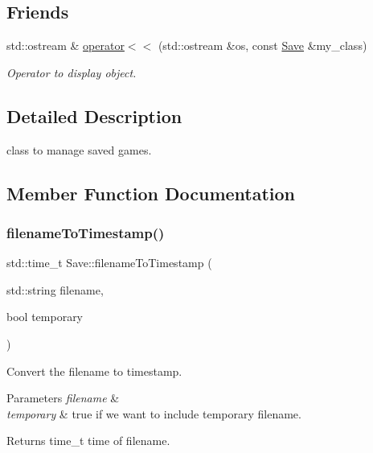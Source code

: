 \subsection*{Friends}
\begin{DoxyCompactItemize}
\item 
std\+::ostream \& \hyperlink{class_save_a3cd403916354948cd0ec21803ec2f78f}{operator$<$$<$} (std\+::ostream \&os, const \hyperlink{class_save}{Save} \&my\+\_\+class)
\begin{DoxyCompactList}\small\item\em Operator to display object. \end{DoxyCompactList}\end{DoxyCompactItemize}


\subsection{Detailed Description}
class to manage saved games. 

\subsection{Member Function Documentation}
\mbox{\label{class_save_af0cd86308d28ff115d3588369baa529a}} 
\subsubsection{\texorpdfstring{filename\+To\+Timestamp()}{filenameToTimestamp()}}
{\footnotesize\ttfamily std\+::time\+\_\+t Save\+::filename\+To\+Timestamp (\begin{DoxyParamCaption}\item[{std\+::string}]{filename,  }\item[{bool}]{temporary }\end{DoxyParamCaption})\hspace{0.3cm}{\ttfamily [static]}}



Convert the filename to timestamp. 


\begin{DoxyParams}{Parameters}
{\em filename} & \\
\hline
{\em temporary} & true if we want to include temporary filename. \\
\hline
\end{DoxyParams}
\begin{DoxyReturn}{Returns}
time\+\_\+t time of filename. 
\end{DoxyReturn}
\mbox{\label{class_save_a469d2ef2ac6a27eda2907e69ab033def}} 
